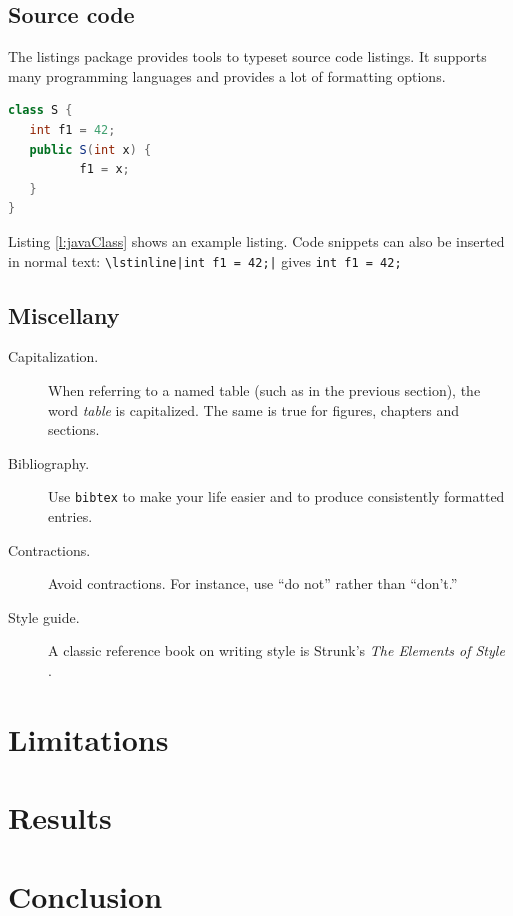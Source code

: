 \documentclass[authoryear,preprint]{sigplanconf}
\begin{document}
\subsection{Source code}

The listings package provides tools to typeset source code
listings. It supports many programming languages and provides a lot of
formatting options.

\lstset{numbers=left, numberstyle=\tiny, stepnumber=1, numbersep=5pt}
\lstset{basicstyle=\ttfamily}
\lstset{frame=tb}

\begin{lstlisting}[float,caption=Example usage of the listing package,label=l:javaClass,language=Java]
class S {
   int f1 = 42;
   public S(int x) {
          f1 = x;
   }
}
\end{lstlisting}

Listing \ref{l:javaClass} shows an example listing. Code snippets can
also be inserted in normal text:
\verb$\lstinline|int f1 = 42;|$ gives \lstinline$int f1 = 42;$


\subsection{Miscellany}

\begin{description}

\item[Capitalization.] When referring to a named table (such as in the
  previous section), the word \emph{table} is capitalized. The same is
  true for figures, chapters and sections.

\item[Bibliography.] Use \verb|bibtex| to make your life easier and to
  produce consistently formatted entries.

\item[Contractions.] Avoid contractions. For instance, use ``do not''
  rather than ``don't.''

\item[Style guide.] A classic reference book on writing style is
  Strunk's \emph{The Elements of Style} \cite{Strunk-ElementsOfStyle}.

\end{description}


\section{Limitations}

\blindtext %


\section{Results}

\blindtext %


\section{Conclusion}

\blindtext %






\end{document}
